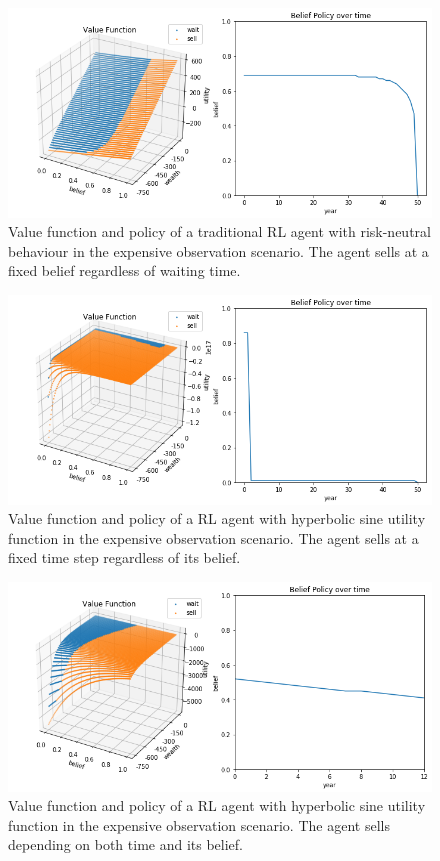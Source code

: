 
\begin{figure}
    \includegraphics[width=0.8\linewidth]{img/rational_policy.png}
\caption{Value function and policy of a traditional RL agent with risk-neutral behaviour in the expensive observation scenario. The agent sells at a fixed belief regardless of waiting time.}
\end{figure}

\begin{figure}
    \includegraphics[width=0.8\linewidth]{img/sine_policy.png}
    \caption{Value function and policy of a RL agent with hyperbolic sine utility function in the expensive observation scenario. The agent sells at a fixed time step regardless of its belief.}
\end{figure}

\begin{figure}
    \includegraphics[width=0.8\linewidth]{img/dynamic_policy.png}
    \caption{Value function and policy of a RL agent with hyperbolic sine utility function in the expensive observation scenario. The agent sells depending on both time and its belief.}
\end{figure}

